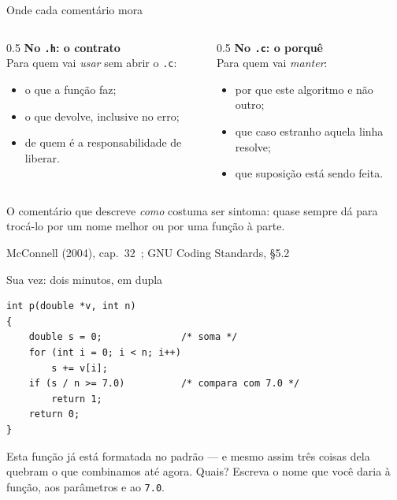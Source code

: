 \documentclass[aspectratio=169]{beamer}
\newcommand{\fonte}[1]{\vfill\hfill{\scriptsize\textcolor{UFSGray}{#1}}}
\begin{document}
\begin{frame}{Onde cada comentário mora}
  \begin{columns}[T]
    \begin{column}{0.5\textwidth}
      \textbf{No \texttt{.h}: o contrato}\\[0.3em]
      Para quem vai \emph{usar} sem abrir o \texttt{.c}:
      \begin{itemize}
        \item o que a função faz;
        \item o que devolve, inclusive no erro;
        \item de quem é a responsabilidade de liberar.
      \end{itemize}
    \end{column}
    \begin{column}{0.5\textwidth}
      \textbf{No \texttt{.c}: o porquê}\\[0.3em]
      Para quem vai \emph{manter}:
      \begin{itemize}
        \item por que este algoritmo e não outro;
        \item que caso estranho aquela linha resolve;
        \item que suposição está sendo feita.
      \end{itemize}
    \end{column}
  \end{columns}
  \begin{block}{}
    \small O comentário que descreve \emph{como} costuma ser sintoma: quase
    sempre dá para trocá-lo por um nome melhor ou por uma função à parte.
  \end{block}
  \fonte{McConnell (2004), cap.~32~\cite{mcconnell2004code}; GNU Coding Standards, §5.2~\cite{gnu2024standards}}
\end{frame}

\begin{frame}[fragile]{Sua vez: dois minutos, em dupla}
\begin{lstlisting}[style=tinyC]
int p(double *v, int n)
{
    double s = 0;              /* soma */
    for (int i = 0; i < n; i++)
        s += v[i];
    if (s / n >= 7.0)          /* compara com 7.0 */
        return 1;
    return 0;
}
\end{lstlisting}
  \begin{block}{}
    Esta função já está formatada no padrão --- e mesmo assim três coisas
    dela quebram o que combinamos até agora. Quais? Escreva o nome que você
    daria à função, aos parâmetros e ao \texttt{7.0}.
  \end{block}
\end{frame}
\end{document}
